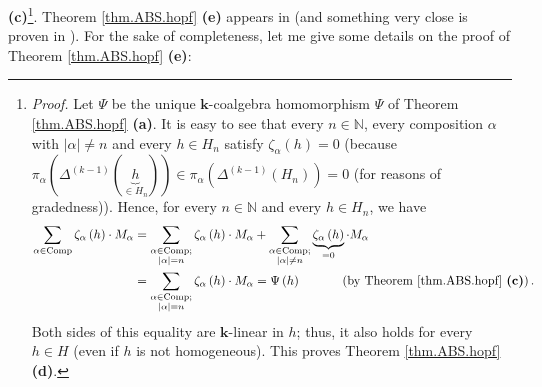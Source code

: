 \documentclass[numbers=enddot,12pt,final,onecolumn,notitlepage,abstracton]{scrartcl}%
\theoremstyle{definition}
\let\sumnonlimits\sum
\renewcommand{\sum}{\sumnonlimits\limits}
\begin{document}
\textbf{(c)}\footnote{\textit{Proof.} Let $\Psi$ be the unique $\mathbf{k}%
$-coalgebra homomorphism $\Psi$ of Theorem \ref{thm.ABS.hopf} \textbf{(a)}. It
is easy to see that every $n\in\mathbb{N}$, every composition $\alpha$ with
$\left\vert \alpha\right\vert \neq n$ and every $h\in H_{n}$ satisfy
$\zeta_{\alpha}\left(  h\right)  =0$ (because $\pi_{\alpha}\left(
\Delta^{\left(  k-1\right)  }\left(  \underbrace{h}_{\in H_{n}}\right)
\right)  \in\pi_{\alpha}\left(  \Delta^{\left(  k-1\right)  }\left(
H_{n}\right)  \right)  =0$ (for reasons of gradedness)). Hence, for every
$n\in\mathbb{N}$ and every $h\in H_{n}$, we have%
\begin{align*}
\sum_{\alpha\in\operatorname*{Comp}}\zeta_{\alpha}\left(  h\right)  \cdot
M_{\alpha}  &  =\sum_{\substack{\alpha\in\operatorname*{Comp};\\\left\vert
\alpha\right\vert =n}}\zeta_{\alpha}\left(  h\right)  \cdot M_{\alpha}%
+\sum_{\substack{\alpha\in\operatorname*{Comp};\\\left\vert \alpha\right\vert
\neq n}}\underbrace{\zeta_{\alpha}\left(  h\right)  }_{=0}\cdot M_{\alpha}\\
&  =\sum_{\substack{\alpha\in\operatorname*{Comp};\\\left\vert \alpha
\right\vert =n}}\zeta_{\alpha}\left(  h\right)  \cdot M_{\alpha}=\Psi\left(
h\right)  \ \ \ \ \ \ \ \ \ \ \left(  \text{by Theorem \ref{thm.ABS.hopf}
\textbf{(c)}}\right)  .
\end{align*}
Both sides of this equality are $\mathbf{k}$-linear in $h$; thus, it also
holds for every $h\in H$ (even if $h$ is not homogeneous). This proves Theorem
\ref{thm.ABS.hopf} \textbf{(d)}.}. Theorem \ref{thm.ABS.hopf} \textbf{(e)}
appears in \cite[Remark 7.1.4]{Reiner} (and something very close is proven in
\cite[Theorem 4.3]{ABS}). For the sake of completeness, let me give some
details on the proof of Theorem \ref{thm.ABS.hopf} \textbf{(e)}:
\end{document}
